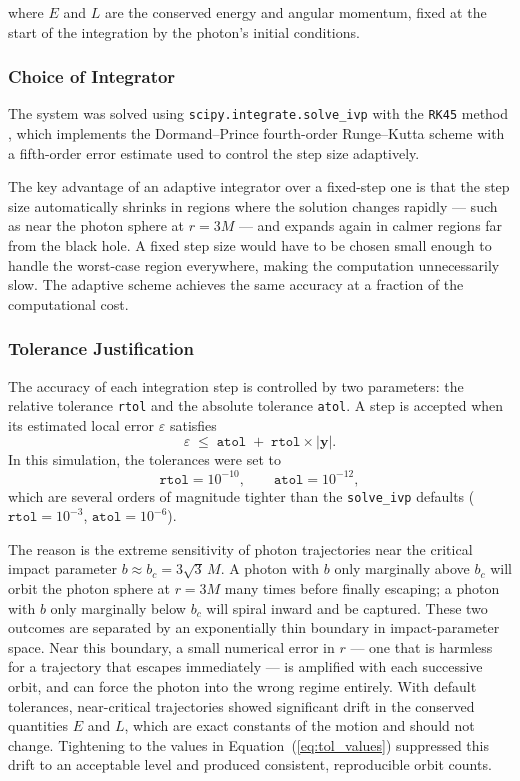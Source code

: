 \documentclass[12pt,a4paper]{article}
\begin{document}
\noindent
where $E$ and $L$ are the conserved energy and angular momentum, fixed at the start of the integration by the photon's initial conditions.

\subsubsection{Choice of Integrator}
The system was solved using \texttt{scipy.integrate.solve\_ivp} with the \texttt{RK45} method \citep{Virtanen2020}, which implements the Dormand--Prince fourth-order Runge--Kutta scheme with a fifth-order error estimate used to control the step size adaptively.

The key advantage of an adaptive integrator over a fixed-step one is that the step size automatically shrinks in regions where the solution changes rapidly — such as near the photon sphere at $r = 3M$ — and expands again in calmer regions far from the black hole. A fixed step size would have to be chosen small enough to handle the worst-case region everywhere, making the computation unnecessarily slow. The adaptive scheme achieves the same accuracy at a fraction of the computational cost.

\subsubsection{Tolerance Justification}
The accuracy of each integration step is controlled by two parameters: the relative tolerance \texttt{rtol} and the absolute tolerance \texttt{atol}. A step is accepted when its estimated local error $\varepsilon$ satisfies
\begin{equation}
    \varepsilon \;\leq\; \texttt{atol} \;+\; \texttt{rtol}\times|\mathbf{y}|.
    \label{eq:error_condition}
\end{equation}
In this simulation, the tolerances were set to
\begin{equation}
    \texttt{rtol} = 10^{-10}, \qquad \texttt{atol} = 10^{-12},
    \label{eq:tol_values}
\end{equation}
which are several orders of magnitude tighter than the \texttt{solve\_ivp} defaults
($\texttt{rtol} = 10^{-3}$, $\texttt{atol} = 10^{-6}$).

The reason is the extreme sensitivity of photon trajectories near the critical impact parameter $b \approx b_c = 3\sqrt{3}\,M$. A photon with $b$ only marginally above $b_c$ will orbit the photon sphere at $r = 3M$ many times before finally escaping; a photon with $b$ only marginally below $b_c$ will spiral inward and be captured. These two outcomes are separated by an exponentially thin boundary in impact-parameter space. Near this boundary, a small numerical error in $r$ — one that is harmless for a trajectory that escapes immediately — is amplified with each successive orbit, and can force the photon into the wrong regime entirely. With default tolerances, near-critical trajectories showed significant drift in the conserved quantities $E$ and $L$, which are exact constants of the motion and should not change. Tightening to the values in Equation~(\ref{eq:tol_values}) suppressed this drift to an acceptable level and produced consistent, reproducible orbit counts.
\end{document}
